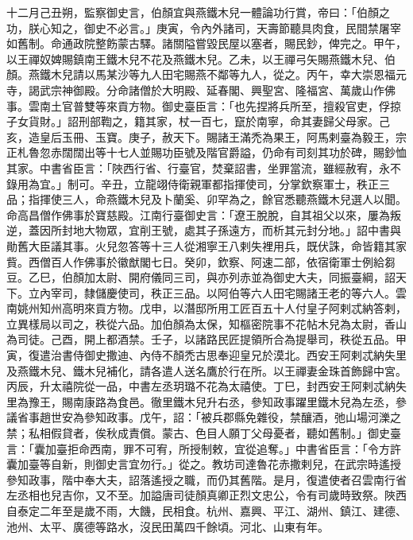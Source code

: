 \begin{pinyinscope}
 十二月己丑朔，監察御史言，伯顏宜與燕鐵木兒一體論功行賞，帝曰：「伯顏之功，朕心知之，御史不必言。」庚寅，令內外諸司，天壽節聽具肉食，民間禁屠宰如舊制。命通政院整飭蒙古驛。諸關隘嘗毀民屋以塞者，賜民鈔，俾完之。甲午，以王禪奴婢賜鎮南王鐵木兒不花及燕鐵木兒。乙未，以王禪弓矢賜燕鐵木兒、伯顏。燕鐵木兒請以馬某沙等九人田宅賜燕不鄰等九人，從之。丙午，幸大崇恩福元寺，謁武宗神御殿。分命諸僧於大明殿、延春閣、興聖宮、隆福宮、萬歲山作佛事。雲南土官普雙等來貢方物。御史臺臣言：「也先捏將兵所至，擅殺官吏，俘掠子女貨財。」詔刑部鞫之，籍其家，杖一百七，竄於南寧，命其妻歸父母家。己亥，造皇后玉冊、玉寶。庚子，赦天下。賜諸王滿禿為果王，阿馬剌臺為毅王，宗正札魯忽赤闊闊出等十七人並賜功臣號及階官爵謚，仍命有司刻其功於碑，賜鈔恤其家。中書省臣言：「陜西行省、行臺官，焚棄詔書，坐罪當流，雖經赦宥，永不錄用為宜。」制可。辛丑，立龍翊侍衛親軍都指揮使司，分掌欽察軍士，秩正三品；指揮使三人，命燕鐵木兒及卜蘭奚、卯罕為之，餘官悉聽燕鐵木兒選人以聞。命高昌僧作佛事於寶慈殿。江南行臺御史言：「遼王脫脫，自其祖父以來，屢為叛逆，蓋因所封地大物眾，宜削王號，處其子孫遠方，而析其元封分地。」詔中書與勛舊大臣議其事。火兒忽答等十三人從湘寧王八剌失裡用兵，既伏誅，命皆籍其家貲。西僧百人作佛事於徽猷閣七日。癸卯，欽察、阿速二部，依宿衛軍士例給芻豆。乙巳，伯顏加太尉、開府儀同三司，與亦列赤並為御史大夫，同振臺綱，詔天下。立內宰司，隸儲慶使司，秩正三品。以阿伯等六人田宅賜諸王老的等六人。雲南姚州知州高明來貢方物。戊申，以潛邸所用工匠百五十人付皇子阿剌忒納答剌，立異樣局以司之，秩從六品。加伯顏為太保，知樞密院事不花帖木兒為太尉，香山為司徒。己酉，開上都酒禁。壬子，以諸路民匠提領所合為提舉司，秩從五品。甲寅，復遣治書侍御史撒迪、內侍不顏禿古思奉迎皇兄於漠北。西安王阿剌忒納失里及燕鐵木兒、鐵木兒補化，請各遣人送名鷹於行在所。以王禪妻金珠首飾歸中宮。丙辰，升太禧院從一品，中書左丞玥璐不花為太禧使。丁巳，封西安王阿剌忒納失里為豫王，賜南康路為食邑。徹里鐵木兒升右丞，參知政事躍里鐵木兒為左丞，參議省事趙世安為參知政事。戊午，詔：「被兵郡縣免雜役，禁釀酒，弛山場河濼之禁；私相假貸者，俟秋成責償。蒙古、色目人願丁父母憂者，聽如舊制。」御史臺言：「囊加臺拒命西南，罪不可宥，所授制敕，宜從追奪。」中書省臣言：「令方許囊加臺等自新，則御史言宜勿行。」從之。教坊司達魯花赤撒剌兒，在武宗時遙授參知政事，階中奉大夫，詔落遙授之職，而仍其舊階。是月，復遣使者召雲南行省左丞相也兒吉你，又不至。加謚唐司徒顏真卿正烈文忠公，令有司歲時致祭。陜西自泰定二年至是歲不雨，大饑，民相食。杭州、嘉興、平江、湖州、鎮江、建德、池州、太平、廣德等路水，沒民田萬四千餘頃。河北、山東有年。



\end{pinyinscope}